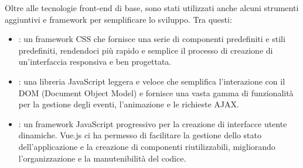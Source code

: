 \documentclass{report}
\begin{document}
Oltre alle tecnologie front-end di base, sono stati utilizzati anche alcuni strumenti aggiuntivi e framework per semplificare lo sviluppo. Tra questi:
\begin{itemize}
\item {}: un framework CSS che fornisce una serie di componenti predefiniti e stili predefiniti, rendendoci più rapido e semplice il processo di creazione di un'interfaccia responsiva e ben progettata.
\item {}: una libreria JavaScript leggera e veloce che semplifica l'interazione con il DOM (Document Object Model) e fornisce una vasta gamma di funzionalità per la gestione degli eventi, l'animazione e le richieste AJAX.
\item {}: un framework JavaScript progressivo per la creazione di interfacce utente dinamiche. Vue.js ci ha permesso di facilitare la gestione dello stato dell'applicazione e la creazione di componenti riutilizzabili, migliorando l'organizzazione e la manutenibilità del codice.
\end{itemize}
\end{document}

